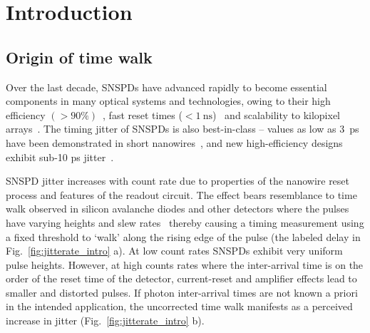 \documentclass[11pt]{caltech_thesis} %
\begin{document}
\hypertarget{introduction-2}{%
\section{Introduction}\label{introduction-2}}

\hypertarget{origin-of-time-walk}{%
\subsection{Origin of time walk}\label{origin-of-time-walk}}

Over the last decade, SNSPDs have advanced rapidly to become essential components in many optical systems and technologies, owing to their high efficiency $(>90\%)$~\autocite{99.5_Chang_2021,reddy2020superconducting}, fast reset times ($< 1~\mathrm{ns}$)~\autocite{Vetter2016Cavity} and scalability to kilopixel arrays~\autocite{Wollman2019}. The timing jitter of SNSPDs is also best-in-class -- values as low as 3~ps have been demonstrated in short nanowires~\autocite{Korzh2020}, and new high-efficiency designs exhibit sub-10 ps jitter~\autocite{EsmaeilZadeh2020,Colangelo2021}.

SNSPD jitter increases with count rate due to properties of the nanowire reset process and features of the readout circuit. The effect bears resemblance to time walk observed in silicon avalanche diodes and other detectors where the pulses have varying heights and slew rates~\autocite{SPAD_walk_Kirchnir_1997} thereby causing a timing measurement using a fixed threshold to `walk' along the rising edge of the pulse (the labeled delay in Fig.~\ref{fig:jitterate_intro} a).
At low count rates SNSPDs exhibit very uniform pulse heights. However, at high counts rates where the inter-arrival time is on the order of the reset time of the detector, current-reset and amplifier effects lead to smaller and distorted pulses. If photon inter-arrival times are not known a priori in the intended application, the uncorrected time walk manifests as a perceived increase in jitter (Fig.~\ref{fig:jitterate_intro} b).
\end{document}
